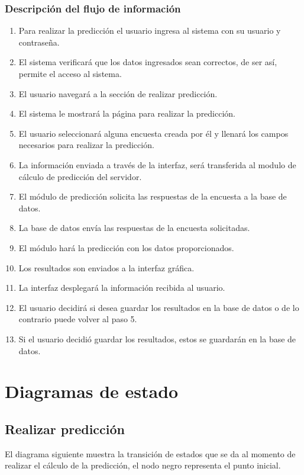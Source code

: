 \subsubsection{Descripción del flujo de información}

\begin{enumerate}
    \item Para realizar la predicción el usuario ingresa al sistema con su usuario y contraseña.
    \item El sistema verificará que los datos ingresados sean correctos, de ser así, permite el acceso al sistema.
    \item El usuario navegará a la sección de realizar predicción.
    \item El sistema le mostrará la página para realizar la predicción.
    \item El usuario seleccionará alguna encuesta creada por él y llenará los campos necesarios para realizar la predicción.
    \item La información enviada a través de la interfaz, será transferida al modulo de cálculo de predicción del servidor.
    \item El módulo de predicción solicita las respuestas de la encuesta a la base de datos.
    \item La base de datos envía las respuestas de la encuesta solicitadas.
    \item El módulo hará la predicción con los datos proporcionados.
    \item Los resultados son enviados a la interfaz gráfica.
    \item La interfaz desplegará la información recibida al usuario.
    \item El usuario decidirá si desea guardar los resultados en la base de datos o de lo contrario puede volver al paso 5.
    \item Si el usuario decidió guardar los resultados, estos se guardarán en la base de datos.
\end{enumerate}

\section{Diagramas de estado}

\subsection{Realizar predicción}
El diagrama siguiente muestra la transición de estados que se da al momento de realizar el cálculo de la predicción, el nodo negro representa el punto inicial.

